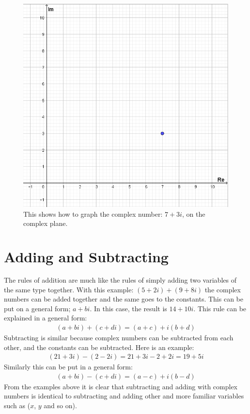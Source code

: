 \begin{figure}[H]
  \includegraphics[scale=0.45]{fig/img/complex_plan.png}
   \caption{This shows how to graph the complex number: $7+3i$, on the complex plane.}
\end{figure}



\section{Adding and Subtracting}
The rules of addition are much like the rules of simply adding two variables of the same type together. With this example: $(5+2i)+(9+8i)$ the complex numbers can be added together and the same goes to the constants. This can be put on a general form; $a+bi$. In this case, the result is $14+10i$. This rule can be explained in a general form: 
\begin{align}
(a + bi) + (c + di) = (a + c) + i(b + d)
\end{align}
Subtracting is similar because complex numbers can be subtracted from each other, and the constants can be subtracted. Here is an example:
\begin{align*}
(21 + 3i) - (2 - 2i) = 21 + 3i - 2 + 2i = 19 + 5i
\end{align*}
Similarly this can be put in a general form:
\begin{align}
(a + bi) - (c + di) = (a - c) + i(b - d)
\end{align}
From the examples above it is clear that subtracting and adding with complex numbers is identical to subtracting and adding other and more familiar variables such as ($x$, $y$ and so on).


